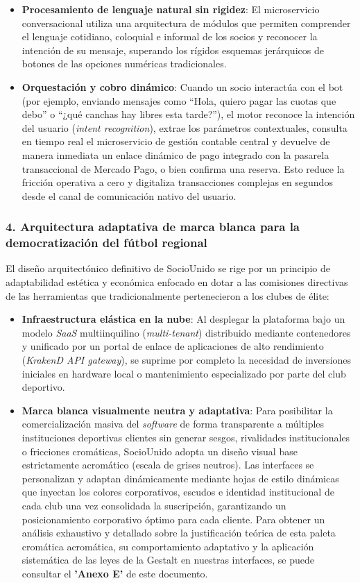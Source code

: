 \begin{itemize}
    \item \textbf{Procesamiento de lenguaje natural sin rigidez}: El microservicio conversacional utiliza una arquitectura de módulos que permiten comprender el lenguaje cotidiano, coloquial e informal de los socios y reconocer la intención de su mensaje, superando los rígidos esquemas jerárquicos de botones de las opciones numéricas tradicionales.
    \item \textbf{Orquestación y cobro dinámico}: Cuando un socio interactúa con el bot (por ejemplo, enviando mensajes como ``Hola, quiero pagar las cuotas que debo'' o ``¿qué canchas hay libres esta tarde?''), el motor reconoce la intención del usuario (\textit{intent recognition}), extrae los parámetros contextuales, consulta en tiempo real el microservicio de gestión contable central y devuelve de manera inmediata un enlace dinámico de pago integrado con la pasarela transaccional de Mercado Pago, o bien confirma una reserva. Esto reduce la fricción operativa a cero y digitaliza transacciones complejas en segundos desde el canal de comunicación nativo del usuario.
\end{itemize}

\subsubsection{4. Arquitectura adaptativa de marca blanca para la democratización del fútbol regional}
El diseño arquitectónico definitivo de SocioUnido se rige por un principio de adaptabilidad estética y económica enfocado en dotar a las comisiones directivas de las herramientas que tradicionalmente pertenecieron a los clubes de élite:

\begin{itemize}
    \item \textbf{Infraestructura elástica en la nube}: Al desplegar la plataforma bajo un modelo \textit{SaaS} multiinquilino (\textit{multi-tenant}) distribuido mediante contenedores y unificado por un portal de enlace de aplicaciones de alto rendimiento (\textit{KrakenD API gateway}), se suprime por completo la necesidad de inversiones iniciales en hardware local o mantenimiento especializado por parte del club deportivo.
    \item \textbf{Marca blanca visualmente neutra y adaptativa}: Para posibilitar la comercialización masiva del \textit{software} de forma transparente a múltiples instituciones deportivas clientes sin generar sesgos, rivalidades institucionales o fricciones cromáticas, SocioUnido adopta un diseño visual base estrictamente acromático (escala de grises neutros). Las interfaces se personalizan y adaptan dinámicamente mediante hojas de estilo dinámicas que inyectan los colores corporativos, escudos e identidad institucional de cada club una vez consolidada la suscripción, garantizando un posicionamiento corporativo óptimo para cada cliente. Para obtener un análisis exhaustivo y detallado sobre la justificación teórica de esta paleta cromática acromática, su comportamiento adaptativo y la aplicación sistemática de las leyes de la Gestalt en nuestras interfaces, se puede consultar el \textbf{'Anexo E'} de este documento.
\end{itemize}
